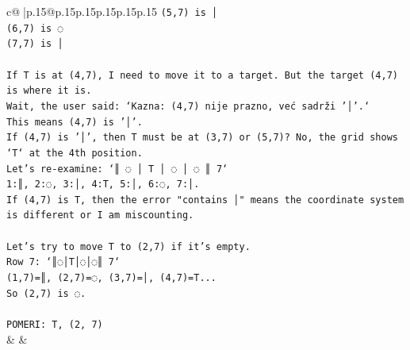\documentclass{article}
\begin{document}
{\begin{supertabular}{c@{$\;$}|p{.15\linewidth}@{}p{.15\linewidth}p{.15\linewidth}p{.15\linewidth}p{.15\linewidth}p{.15\linewidth}}
{{{\texttt{(5,7) is │} \\
\texttt{(6,7) is ◌} \\
\texttt{(7,7) is │} \\
\\ 
\texttt{If T is at (4,7), I need to move it to a target. But the target (4,7) is where it is.} \\
\texttt{Wait, the user said: `Kazna: (4,7) nije prazno, već sadrži '│'.`} \\
\texttt{This means (4,7) is '│'.} \\
\texttt{If (4,7) is '│', then T must be at (3,7) or (5,7)? No, the grid shows `T` at the 4th position.} \\
\texttt{Let's re{-}examine: `║ ◌ │ T │ ◌ │ ◌ ║ 7`} \\
\texttt{1:║, 2:◌, 3:│, 4:T, 5:│, 6:◌, 7:│.} \\
\texttt{If (4,7) is T, then the error "contains │" means the coordinate system is different or I am miscounting.} \\
\\ 
\texttt{Let's try to move T to (2,7) if it's empty.} \\
\texttt{Row 7: `║◌│T│◌│◌║ 7`} \\
\texttt{(1,7)=║, (2,7)=◌, (3,7)=│, (4,7)=T...} \\
\texttt{So (2,7) is ◌.} \\
\\ 
\texttt{POMERI: T, (2, 7)} \\
            }
        }
    }
    & & \\ \\


\end{supertabular}}
\end{document}
